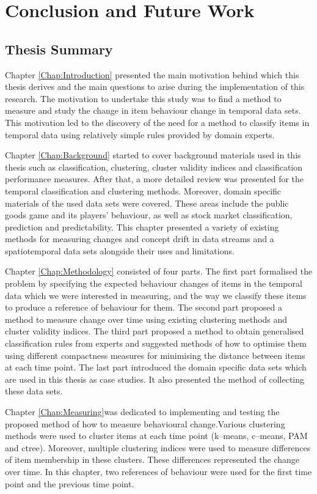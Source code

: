 \chapter{Conclusion and Future Work}
\label{Chap:Conclusion}

\section{Thesis Summary}

Chapter \ref{Chap:Introduction} presented the main motivation behind which this thesis derives and the main questions to arise during the implementation of this research. The motivation to undertake this study was to find a method to measure and study the change in item behaviour change in temporal data sets. This motivation led to the discovery of the need for a method to classify items in temporal data using relatively simple rules provided by domain experts.

Chapter \ref{Chap:Background} started to cover background materials used in this thesis such as classification, clustering, cluster validity indices and classification performance measures. After that, a more detailed review was presented for the temporal classification and clustering methods. Moreover, domain specific materials of the used data sets were covered. These areas include the public goods game and its players' behaviour, as well as stock market classification, prediction and predictability. This chapter presented a variety of existing methods for measuring changes and concept drift in data streams and a spatiotemporal data sets alongside their uses and limitations.

Chapter \ref{Chap:Methodology} consisted of four parts. The first part formalised the problem by specifying the expected behaviour changes of items in the temporal data which we were interested in measuring, and the way we classify these items to produce a reference of behaviour for them. The second part proposed a method to measure change over time using existing clustering methods and cluster validity indices. The third part proposed a method to obtain generalised classification rules from experts and suggested methods of how to optimise them using different compactness measures for minimising the distance between items at each time point. The last part introduced the domain specific data sets which are used in this thesis as case studies. It also presented the method of collecting these data sets.


Chapter \ref{Chap:Measuring}was dedicated to implementing and testing the proposed method of how to measure behavioural change.Various clustering methods were used to cluster items at each time point (k--means, c--means, PAM and ctree). Moreover, multiple clustering indices were used to measure differences of item membership in these clusters. These differences represented the change over time. In this chapter, two references of behaviour were used for the first time point and the previous time point.

